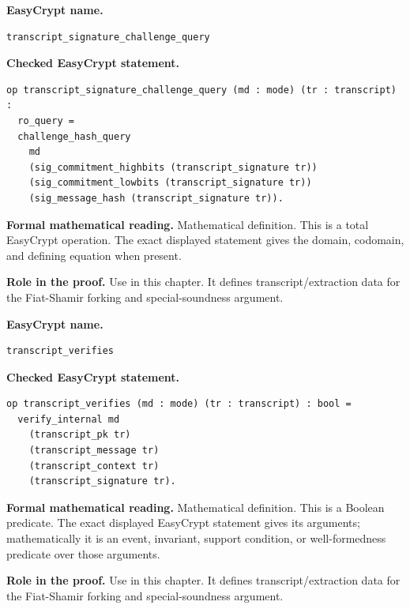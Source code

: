 \begin{formaldefinition}
\noindent\textbf{EasyCrypt name.}
\begin{lstlisting}[language=EasyCrypt,basicstyle=\ttfamily\scriptsize]
transcript_signature_challenge_query
\end{lstlisting}
\noindent\textbf{Checked EasyCrypt statement.}
\begin{lstlisting}[language=EasyCrypt,basicstyle=\ttfamily\scriptsize]
op transcript_signature_challenge_query (md : mode) (tr : transcript) :
  ro_query =
  challenge_hash_query
    md
    (sig_commitment_highbits (transcript_signature tr))
    (sig_commitment_lowbits (transcript_signature tr))
    (sig_message_hash (transcript_signature tr)).
\end{lstlisting}
\noindent\textbf{Formal mathematical reading.}
Mathematical definition. This is a total EasyCrypt operation.  The exact displayed statement gives the domain, codomain, and defining equation when present.

\noindent\textbf{Role in the proof.}
Use in this chapter. It defines transcript/extraction data for the Fiat-Shamir forking and special-soundness argument.

\end{formaldefinition}

\begin{formaldefinition}
\noindent\textbf{EasyCrypt name.}
\begin{lstlisting}[language=EasyCrypt,basicstyle=\ttfamily\scriptsize]
transcript_verifies
\end{lstlisting}
\noindent\textbf{Checked EasyCrypt statement.}
\begin{lstlisting}[language=EasyCrypt,basicstyle=\ttfamily\scriptsize]
op transcript_verifies (md : mode) (tr : transcript) : bool =
  verify_internal md
    (transcript_pk tr)
    (transcript_message tr)
    (transcript_context tr)
    (transcript_signature tr).
\end{lstlisting}
\noindent\textbf{Formal mathematical reading.}
Mathematical definition. This is a Boolean predicate.  The exact displayed EasyCrypt statement gives its arguments; mathematically it is an event, invariant, support condition, or well-formedness predicate over those arguments.

\noindent\textbf{Role in the proof.}
Use in this chapter. It defines transcript/extraction data for the Fiat-Shamir forking and special-soundness argument.

\end{formaldefinition}

